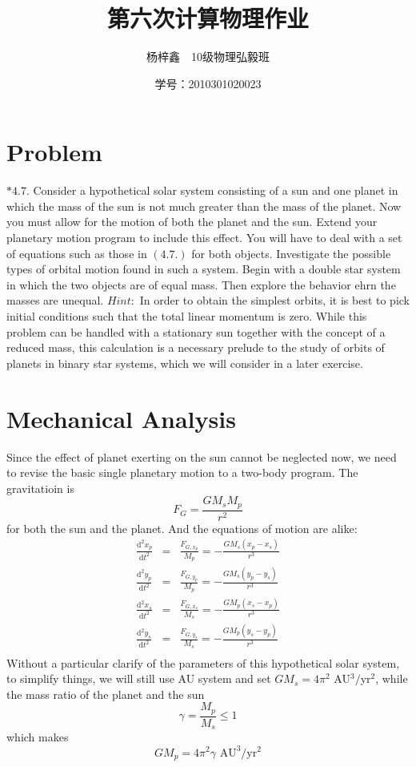 \documentclass{article}
\author{杨梓鑫\ \ 10级物理弘毅班}
\title{第六次计算物理作业}
\date{学号：2010301020023}
\newcommand{\ud}{\mathrm{d}}
\begin{document}
	\maketitle
\section{Problem}
\quad $*\mathbf{4.7.}$ Consider a hypothetical solar system consisting of a sun and one planet in which the mass of the sun is not much greater than the mass of the planet. Now you must allow for the motion of both the planet and the sun. Extend your planetary motion program to include this effect. You will have to deal with a set of equations such as those in $(\mathbf{4.7.})$ for both objects. Investigate the possible types of orbital motion found in such a system. Begin with a double star system in which the two objects are of equal mass. Then explore the behavior ehrn the masses are unequal. $Hint:$ In order to obtain the simplest orbits, it is best to pick initial conditions such that the total linear momentum is zero. While this problem can be handled with a stationary sun together with the concept of a reduced mass, this calculation is a necessary prelude to the study of orbits of planets in binary star systems, which we will consider in a later exercise.\\

\section{Mechanical Analysis}
Since the effect of planet exerting on the sun cannot be neglected now, we need to revise the basic single planetary motion to a two-body program. The gravitatioin is $$F_G=\frac{GM_sM_p}{r^2}$$ for both the sun and the planet. And the equations of motion are alike:
\begin{eqnarray*}
\frac{\ud ^2x_p}{\ud t^2} &=& \frac{F_{G,x_p}}{M_p} = -\frac{GM_s\left(x_p-x_s\right)}{r^3}\\	
\frac{\ud ^2y_p}{\ud t^2} &=& \frac{F_{G,y_p}}{M_p} = -\frac{GM_s\left(y_p-y_s\right)}{r^3}\\	
\frac{\ud ^2x_s}{\ud t^2} &=& \frac{F_{G,x_s}}{M_s} = -\frac{GM_p\left(x_s-x_p\right)}{r^3}\\	
\frac{\ud ^2y_s}{\ud t^2} &=& \frac{F_{G,y_s}}{M_s} = -\frac{GM_p\left(y_s-y_p\right)}{r^3}\\	
\end{eqnarray*}
Without a particular clarify of the parameters of this hypothetical solar system, to simplify things, we will still use AU system and set $GM_s =4\pi^2$ AU$^3/$yr$^2$, while the mass ratio of the planet and the sun $$ \gamma = \frac{M_p}{M_s} \leq 1$$ which makes $$GM_p =4\pi^2\gamma \textrm{ AU}^3/\textrm{yr}^2$$\\
\end{document}
